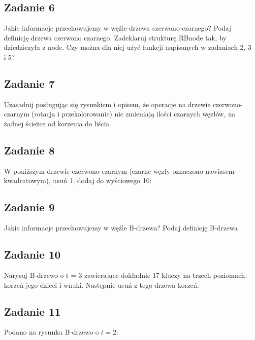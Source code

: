 \documentclass{article}
\begin{document}
\subsection*{Zadanie 6}
Jakie informacje przechowujemy w węźle drzewa czerwono-czarnego? Podaj definicję drzewa
czerwono czarnego. Zadeklaruj strukturę RBnode tak, by dziedziczyła z node. Czy można dla niej użyć funkcji napisanych
w zadaniach 2, 3 i 5?

\subsection*{Zadanie 7}
Uzasadnij posługując się rysunkiem i opisem, że operacje na drzewie czerwono-czarnym (rotacja i
przekolorowanie) nie zmieniają ilości czarnych węzłów, na żadnej ścieżce od korzenia do liścia

\subsection*{Zadanie 8}
W poniższym drzewie czerwono-czarnym (czarne węzły oznaczono nawiasem kwadratowym), usuń 1,
dodaj do wyściowego 10:

\subsection*{Zadanie 9}
Jakie informacje przechowujemy w węźle B-drzewa? Podaj definicję B-drzewa

\subsection*{Zadanie 10}
Narysuj B-drzewo o t = 3 zawierające dokładnie 17 kluczy na trzech poziomach: korzeń jego
dzieci i wnuki. Następnie usuń z tego drzewa korzeń.

\subsection*{Zadanie 11}
Podano na rysunku B-drzewo o $t=2$:
\end{document}
